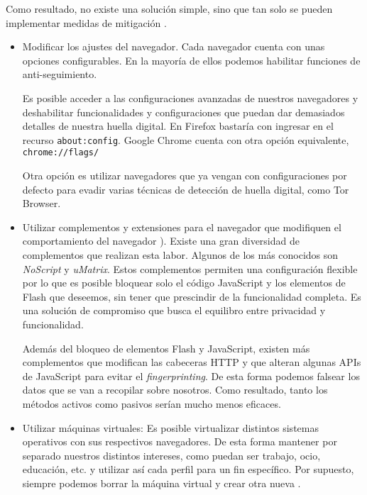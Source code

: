 Como resultado, no existe una solución simple, sino que tan solo se pueden implementar medidas de mitigación \cite{mitigations_w3c}. \par 

\begin{itemize}
	\item Modificar los ajustes del navegador. Cada navegador cuenta con unas opciones configurables. En la mayoría de ellos podemos habilitar funciones de anti-seguimiento. \par
	
	Es posible acceder a las configuraciones avanzadas de nuestros navegadores y deshabilitar funcionalidades y configuraciones que puedan dar demasiados detalles de nuestra huella digital. En Firefox bastaría con ingresar en el recurso \texttt{about:config}. Google Chrome cuenta con otra opción equivalente, \texttt{chrome://flags/} \par
	
	Otra opción es utilizar navegadores que ya vengan con configuraciones por defecto para evadir varias técnicas de detección de huella digital, como Tor Browser. \par 
	
	\item Utilizar complementos y extensiones para el navegador que modifiquen el comportamiento del navegador \cite{pixelprivacy}). Existe una gran diversidad de complementos que realizan esta labor. Algunos de los más conocidos son \textit{NoScript} y \textit{uMatrix}. Estos complementos permiten una configuración flexible por lo que es posible bloquear solo el código JavaScript y los elementos de Flash que deseemos, sin tener que prescindir de la funcionalidad completa. Es una solución de compromiso que busca el equilibro entre privacidad y funcionalidad. \par
	
	Además del bloqueo de elementos Flash y JavaScript, existen más complementos que modifican las cabeceras HTTP y que alteran algunas APIs de JavaScript para evitar el \textit{fingerprinting}. De esta forma podemos falsear los datos que se van a recopilar sobre nosotros. Como resultado, tanto los métodos activos como pasivos serían mucho menos eficaces. \par 
	
	
	\item Utilizar máquinas virtuales: Es posible virtualizar distintos sistemas operativos con sus respectivos navegadores. De esta forma mantener por separado nuestros distintos intereses, como puedan ser trabajo, ocio, educación, etc. y utilizar así cada perfil para un fin específico. Por supuesto, siempre podemos borrar la máquina virtual y crear otra nueva \cite{restoreprivacy}. \par 
	
\end{itemize}

